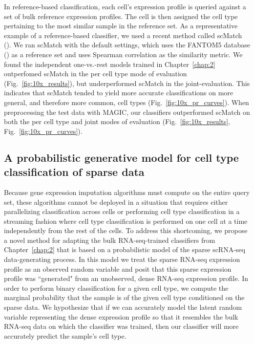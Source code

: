 In reference-based classification, each cell's expression profile is queried against a set of bulk reference expression profiles. The cell is then assigned the cell type pertaining to the most similar sample in the reference set.  As a representative example of a reference-based classifier, we used a recent method called scMatch  (\citealp{Hou2019}). We ran scMatch with the default settings, which uses the FANTOM5 database (\citealp{Lizio2017}) as a reference set and uses Spearman correlation as the similarity metric.   We found the independent one-vs.-rest models trained in Chapter~\ref{chap:2} outperfomed scMatch in the per cell type mode of evaluation (Fig.~\ref{fig:10x_results}), but underperformed scMatch in the joint-evaluation. This indicates that scMatch tended to yield more accurate classifications on more general, and therefore more common, cell types (Fig.~\ref{fig:10x_pr_curves}). When preprocessing the test data with MAGIC, our classifiers outperformed scMatch on both the per cell type and joint modes of evaluation (Fig.~\ref{fig:10x_results}, Fig.~\ref{fig:10x_pr_curves}).


\subsection{A probabilistic generative model for cell type classification of sparse data}\label{sec:sc_new_model}

Because gene expression imputation algorithms must compute on the entire query set, these algorithms cannot be deployed in a situation that requires either parallelizing classification across cells or performing cell type classification in a streaming fashion where cell type classification is performed on one cell at a time independently from the rest of the cells.   To address this shortcoming, we propose a novel method for adapting the bulk RNA-seq-trained classifiers from Chapter~\ref{chap:2} that is based on a probabilistic model of the sparse scRNA-seq data-generating process.  In this model we treat the sparse RNA-seq expression profile as an observed random variable and posit that this sparse expression profile was ``generated" from an unobserved, dense RNA-seq expression profile.  In order to perform binary classification for a given cell type, we compute the marginal probability that the sample is of the given cell type conditioned on the sparse data.  We hypothesize that if we can accurately model the latent random variable representing the dense expression profile so that it resembles the bulk RNA-seq data on which the classifier was trained, then our classifier will more accurately predict the sample's cell type.  


